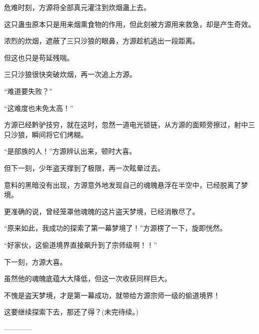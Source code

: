 \begin{this_body}
危难时刻，方源将全部真元灌注到炊烟蛊上去。

这只蛊虫原本只是用来烟熏食物的作用，但此刻被方源用来救急，却是产生奇效。

浓烈的炊烟，遮蔽了三只沙狼的眼鼻，方源趁机逃出一段距离。

但这也只是苟延残喘。

三只沙狼很快突破炊烟，再一次追上方源。

“难道要失败？”

“这难度也未免太高！”

方源已经黔驴技穷，就在这时，忽然一道电光锁链，从方源的面颊旁擦过，射中三只沙狼，瞬间将它们烤糊。

“是部族的人！”方源辨认出来，顿时大喜。

但下一刻，少年盗天撑到了极限，再一次眩晕过去。

意料的黑暗没有出现，方源意外地发现自己的魂魄悬浮在半空中，已经脱离了梦境。

更准确的说，曾经笼罩他魂魄的这片盗天梦境，已经消散尽了。

“原来如此，我成功的探索了第一幕梦境了！”方源楞了一下，旋即恍然。

“好家伙，这偷道境界直接飙升到了宗师级啊！！”

下一刻，方源大喜。

虽然他的魂魄底蕴大大降低，但这一次收获同样巨大。

不愧是盗天梦境，才是第一幕成功，就带给方源宗师一级的偷道境界！

这要继续探索下去，那还了得？(未完待续。)

------------

\end{this_body}

